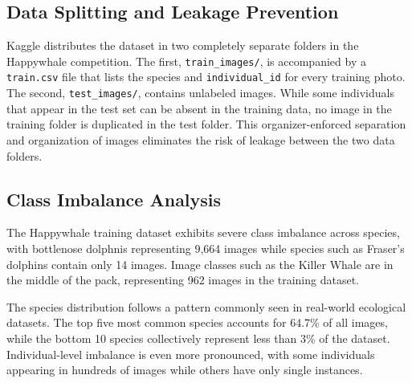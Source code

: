 \documentclass[twocolumn]{article}
\begin{document}
\subsection{Data Splitting and Leakage Prevention}

Kaggle distributes the dataset in two completely separate folders in the Happywhale competition. The first, \texttt{train\_images/}, is accompanied by a \texttt{train.csv} file that lists the species and \texttt{individual_id} for every training photo. The second, \texttt{test_images/}, contains unlabeled images. While some individuals that appear in the test set can be absent in the training data, no image in the training folder is duplicated in the test folder. This organizer-enforced separation and organization of images eliminates the risk of leakage between the two data folders.  

\subsection{Class Imbalance Analysis}

The Happywhale training dataset exhibits severe class imbalance across species, with bottlenose dolphnis representing 9,664 images while species such as Fraser's dolphins contain only 14 images.  Image classes such as the Killer Whale are in the middle of the pack, representing 962 images in the training dataset. 

The species distribution follows a pattern commonly seen in real-world ecological datasets. The top five most common species accounts for 64.7\% of all images, while the bottom 10 species collectively represent less than 3\% of the dataset. Individual-level imbalance is even more pronounced, with some individuals appearing in hundreds of images while others have only single instances. 
\end{document}
